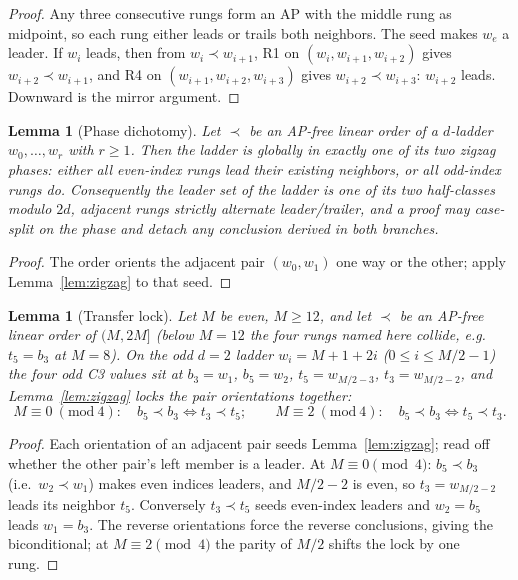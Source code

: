 \documentclass[11pt]{article}
\newtheorem{lemma}[theorem]{Lemma}
\theoremstyle{definition}
\begin{document}
\begin{proof}
Any three consecutive rungs form an AP with the middle rung as
midpoint, so each rung either leads or trails both neighbors. The seed
makes $w_e$ a leader. If $w_i$ leads, then from $w_i \prec w_{i+1}$,
R1 on $(w_i, w_{i+1}, w_{i+2})$ gives $w_{i+2} \prec w_{i+1}$, and R4
on $(w_{i+1}, w_{i+2}, w_{i+3})$ gives $w_{i+2} \prec w_{i+3}$: $w_{i+2}$
leads. Downward is the mirror argument.
\end{proof}

\begin{lemma}[Phase dichotomy]\label{lem:phase}
Let $\prec$ be an AP-free linear order of a $d$-ladder $w_0, \dots, w_r$
with $r \ge 1$. Then the ladder is globally in exactly one of its two
\emph{zigzag phases}: either all even-index rungs lead their existing
neighbors, or all odd-index rungs do. Consequently the \emph{leader set} of the
ladder is one of its two half-classes modulo $2d$, adjacent rungs
strictly alternate leader/trailer, and a proof may case-split on the
phase and detach any conclusion derived in both branches.
\end{lemma}

\begin{proof}
The order orients the adjacent pair $(w_0, w_1)$ one way or the other;
apply Lemma~\ref{lem:zigzag} to that seed.
\end{proof}

\begin{lemma}[Transfer lock]\label{lem:transfer}
Let $M$ be even, $M \ge 12$, and let $\prec$ be an AP-free linear order
of $(M, 2M]$ (below $M = 12$ the four rungs named here
collide, e.g.\ $t_5 = b_3$ at $M = 8$). On the odd $d=2$ ladder $w_i = M + 1 + 2i$
($0 \le i \le M/2 - 1$) the four odd C3 values sit at $b_3 = w_1$,
$b_5 = w_2$, $t_5 = w_{M/2-3}$, $t_3 = w_{M/2-2}$, and
Lemma~\ref{lem:zigzag} locks the pair orientations together:
\[
M \equiv 0 \ (\mathrm{mod}\ 4)\colon\quad b_5 \prec b_3
\iff t_3 \prec t_5;
\qquad
M \equiv 2 \ (\mathrm{mod}\ 4)\colon\quad b_5 \prec b_3 \iff t_5 \prec t_3.
\]
\end{lemma}

\begin{proof}
Each orientation of an adjacent pair seeds Lemma~\ref{lem:zigzag}; read
off whether the other pair's left member is a leader. At
$M \equiv 0 \pmod 4$: $b_5 \prec b_3$ (i.e.\ $w_2 \prec w_1$) makes
even indices leaders, and $M/2 - 2$ is even, so $t_3 = w_{M/2-2}$
leads its neighbor $t_5$. Conversely $t_3 \prec t_5$ seeds even-index
leaders and $w_2 = b_5$ leads $w_1 = b_3$. The reverse orientations
force the reverse conclusions, giving the biconditional; at
$M \equiv 2 \pmod 4$ the parity of $M/2$ shifts the lock by one rung.
\end{proof}
\end{document}
